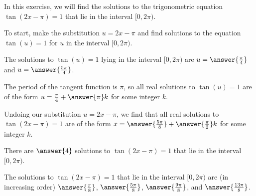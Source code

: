 \documentclass{ximera}
\author{Kenneth Berglund}
\begin{document}
\licenseSZ
In this exercise, we will find the solutions to the trigonometric equation $\tan(2x - \pi) = 1$ that lie in the interval $[0, 2\pi)$.

To start, make the substitution $u = 2x - \pi$ and find solutions to the equation $\tan(u) = 1$ for $u$ in the interval $[0, 2\pi)$. 

The solutions to $\tan(u) = 1$ lying in the interval $[0, 2\pi)$ are $u = \answer{\frac{\pi}{4}}$ and $u = \answer{\frac{5\pi}{4}}$.

\begin{exercise}
The period of the tangent function is $\pi$, so all real solutions to $\tan(u) = 1$ are of the form $u = \frac{\pi}{4} + \answer{\pi}k$ for some integer $k$. 

\begin{exercise}
Undoing our substitution $u = 2x - \pi$, we find that all real solutions to $\tan(2x-\pi) = 1$ are of the form $x = \answer{\frac{5\pi}{8}} + \answer{\frac{\pi}{2}}k$ for some integer $k$.

\begin{exercise}
There are $\answer{4}$ solutions to $\tan(2x - \pi) = 1$ that lie in the interval $[0, 2\pi)$.

\begin{exercise}
The solutions to $\tan(2x - \pi) = 1$ that lie in the interval $[0, 2\pi)$ are (in increasing order) $\answer{\frac{\pi}{8}}$, $\answer{\frac{5\pi}{8}}$, $\answer{\frac{9\pi}{8}}$, and $\answer{\frac{13\pi}{8}}$.


\end{exercise}
\end{exercise}
\end{exercise}
\end{exercise}
\end{document}
